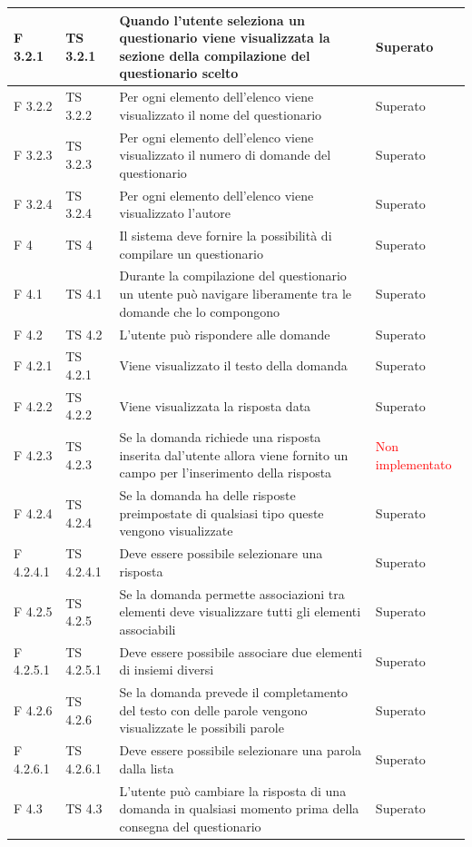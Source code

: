 \documentclass[a4paper,11pt]{article}
\begin{document}
\begin{longtable}{p{}p{}p{}p{}}
\midrule
F 3.2.1 &TS 3.2.1&Quando l'utente seleziona un questionario viene visualizzata la sezione della compilazione del questionario scelto & Superato\\
\midrule
F 3.2.2 &TS 3.2.2&Per ogni elemento dell'elenco viene visualizzato il nome del questionario & Superato\\
\midrule
F 3.2.3 & TS 3.2.3 &Per ogni elemento dell'elenco viene visualizzato il numero di domande del questionario & Superato\\
\midrule
F 3.2.4 &TS 3.2.4 &Per ogni elemento dell'elenco viene visualizzato l'autore & Superato\\
\midrule
F 4 & TS 4&Il sistema deve fornire la possibilità di compilare un questionario & Superato\\
\midrule
F 4.1 &TS 4.1 &Durante la compilazione del questionario un utente può navigare liberamente tra le domande che lo compongono & Superato\\
\midrule
F 4.2 & TS 4.2 &L'utente può rispondere alle domande & Superato\\
\midrule
F 4.2.1 &TS 4.2.1&Viene visualizzato il testo della domanda & Superato\\
\midrule
F 4.2.2 &TS 4.2.2 &Viene visualizzata la risposta data & Superato\\
\midrule
F 4.2.3 & TS 4.2.3 &Se la domanda richiede una risposta inserita dal'utente allora viene fornito un campo per l'inserimento della risposta & \textcolor{red}{Non implementato}\\
\midrule
F 4.2.4 &TS 4.2.4 &Se la domanda ha delle risposte preimpostate di qualsiasi tipo queste vengono visualizzate & Superato\\
\midrule
F 4.2.4.1 & TS 4.2.4.1 &Deve essere possibile selezionare una risposta & Superato\\
\midrule
F 4.2.5 & TS 4.2.5 &Se la domanda permette associazioni tra elementi deve visualizzare tutti gli elementi associabili & Superato\\
\midrule
F 4.2.5.1 & TS 4.2.5.1 &Deve essere possibile associare due elementi di insiemi diversi & Superato\\
\midrule
F 4.2.6 & TS 4.2.6 &Se la domanda prevede il completamento del testo con delle parole vengono visualizzate le possibili parole & Superato\\
\midrule
F 4.2.6.1 & TS 4.2.6.1 &Deve essere possibile selezionare una parola dalla lista & Superato\\
\midrule
F 4.3 & TS 4.3&L'utente può cambiare la risposta di una domanda in qualsiasi momento prima della consegna del questionario & Superato\\

\end{longtable}
\end{document}
